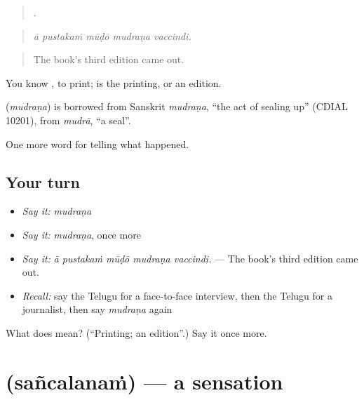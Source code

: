 \begin{quote}
    .
\end{quote}

\begin{quote}
\emph{ā pustakaṁ mūḍō mudraṇa vaccindi.}
\end{quote}

\begin{quote}
The book's third edition came out.
\end{quote}

You know , to print;  is the printing, or an edition.

\begin{cousinweb}
\textbf{} (\emph{mudraṇa}) is borrowed from Sanskrit \emph{mudraṇa}, \textquotedblleft{}the act of sealing up\textquotedblright{} (CDIAL 10201), from \emph{mudrā}, \textquotedblleft{}a seal\textquotedblright{}.
\end{cousinweb}

\begin{grammarlens}[title={What you've built}]
One more word for telling what happened.
\end{grammarlens}

\subsection*{Your turn}
\begin{itemize}
\raggedright
  \item \emph{Say it:} \emph{mudraṇa}
  \item \emph{Say it:} \emph{mudraṇa}, once more
  \item \emph{Say it:} \emph{ā pustakaṁ mūḍō mudraṇa vaccindi.} — The book's third edition came out.
  \item \emph{Recall:} say the Telugu for a face-to-face interview, then the Telugu for a journalist, then say \emph{mudraṇa} again
\end{itemize}

\begin{tcolorbox}[breakable,colback=teal!4,colframe=teal!35!black,title={Before you move on}]
What does  mean? (\textquotedblleft{}Printing; an edition\textquotedblright{}.) Say it once more.
\end{tcolorbox}
\section[\texorpdfstring{\te{సంచలనం} (sañcalanaṁ)}{సంచలనం (sañcalanaṁ)}]{ (sañcalanaṁ) — a sensation}

